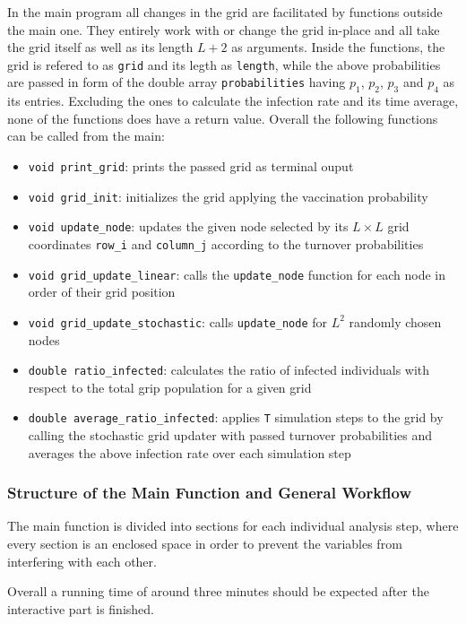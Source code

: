 In the main program all changes in the grid are facilitated by functions outside the main one. They entirely work with or change the grid in-place and all take the grid itself as well as its length $L+2$ as arguments.
Inside the functions, the grid is refered to as \texttt{grid} and its legth as \texttt{length}, while the above probabilities are passed in form of the double array \texttt{probabilities} having $p_1$, $p_2$, $p_3$ 
and $p_4$ as its entries. Excluding the ones to calculate the infection rate and its time average, none of the functions does have a return value. Overall the following functions can be called from the main:
\begin{itemize}
    \item \texttt{void print\_grid}: prints the passed grid as terminal ouput
    \item \texttt{void grid\_init}: initializes the grid applying the vaccination probability
    \item \texttt{void update\_node}: updates the given node selected by its $L\times L$ grid coordinates \texttt{row\_i} and \texttt{column\_j} according to the turnover probabilities
    \item \texttt{void grid\_update\_linear}: calls the \texttt{update\_node} function for each node in order of their grid position
    \item \texttt{void grid\_update\_stochastic}: calls \texttt{update\_node} for $L^2$ randomly chosen nodes
    \item \texttt{double ratio\_infected}: calculates the ratio of infected individuals with respect to the total grip population for a given grid
    \item \texttt{double average\_ratio\_infected}: applies \texttt{T} simulation steps to the grid by calling the stochastic grid updater with passed turnover probabilities 
    and averages the above infection rate over each simulation step
\end{itemize}


\subsubsection{Structure of the Main Function and General Workflow}

The main function is divided into sections for each individual analysis step, where every section is an enclosed space in order to prevent the variables from interfering with each other.

Overall a running time of around three minutes should be expected after the interactive part is finished.


